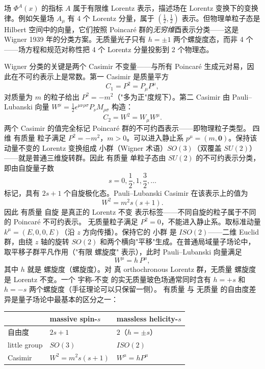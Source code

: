 场 $\Phi^A(x)$ 的指标 $A$ 属于有限维 Lorentz 表示，描述场在 Lorentz 变换下的变换律。例如矢量场 $A_\mu$ 有 4 个 Lorentz 分量，属于 $(\frac{1}{2},\frac{1}{2})$ 表示。但物理单粒子态是 Hilbert 空间中的向量，它们按照 Poincaré 群的\emph{无穷维}酉表示分类——这是 Wigner 1939 年的分类方案。无质量光子只有 $h=\pm1$ 两个螺旋度态，而非 4 个——场方程和规范对称性把 4 个 Lorentz 分量投影到 2 个物理态。

Wigner 分类的关键是两个 Casimir 不变量——与所有 Poincaré 生成元对易，因此在不可约表示上是常数。第一 Casimir 是质量平方
\begin{equation}
C_1=P^2=P_\mu P^\mu,
\end{equation}
对质量为 $m$ 的粒子给出 $P^2=-m^2$（"多为正"度规下）。第二 Casimir 由 Pauli--Lubanski 向量 $W^\mu=\frac{1}{2}\epsilon^{\mu\nu\rho\sigma}P_\nu M_{\rho\sigma}$ 构造：
\begin{equation}
C_2=W^2=W_\mu W^\mu.
\end{equation}
两个 Casimir 的值完全标记 Poincaré 群的不可约酉表示——即物理粒子类型。
四维 有质量 粒子满足 $P^2=-m^2$，$m>0$。可以进入静止系 $p^\mu=(m,\mathbf{0})$。保持该动量不变的 Lorentz 变换组成 小群（Wigner 术语）$SO(3)$（双覆盖 $SU(2)$）——就是普通三维旋转群。因此 有质量 单粒子态由 $SU(2)$ 的不可约表示分类，即由自旋量子数
\begin{equation}
s=0,\frac{1}{2},1,\frac{3}{2},\ldots
\end{equation}
标记，具有 $2s+1$ 个自旋极化态。Pauli--Lubanski Casimir 在该表示上的值为
\begin{equation*}\boxed{W^2=m^2 s(s+1).}
\end{equation*}
因此 有质量 自旋 是真正的 Lorentz 不变 表示标签——不同自旋的粒子属于不同的 Poincaré 不可约表示。
无质量粒子满足 $P^2=0$，不能进入静止系。取标准动量 $k^\mu=(E,0,0,E)$（沿 $z$ 方向传播）。保持它的 小群 是 $ISO(2)$——二维 Euclid 群，由绕 $z$ 轴的旋转 $SO(2)$ 和两个横向"平移"生成。在普通局域量子场论中，取平移子群平凡作用（"有限 螺旋度" 表示），此时 Pauli--Lubanski 向量满足
\begin{equation*}\boxed{W^\mu=h\,P^\mu,}
\end{equation*}
其中 $h$ 就是 螺旋度（螺旋度）。对 真 orthochronous Lorentz 群，无质量 螺旋度 是 Lorentz 不变。一个 宇称-不变 的实无质量玻色场通常同时含有 $h=+s$ 和 $h=-s$ 两个螺旋度（手征理论可以只保留一侧）。
有质量 与 无质量 的自由度差异是量子场论中最基本的区分之一：

\begin{center}
\begin{tabular}{lll}
\hline
 & massive spin-$s$ & massless helicity-$s$ \\
\hline
自由度 & $2s+1$ & $2$（$h=\pm s$） \\
little group & $SO(3)$ & $ISO(2)$ \\
Casimir & $W^2=m^2s(s+1)$ & $W^\mu=hP^\mu$ \\
\hline
\end{tabular}
\end{center}

